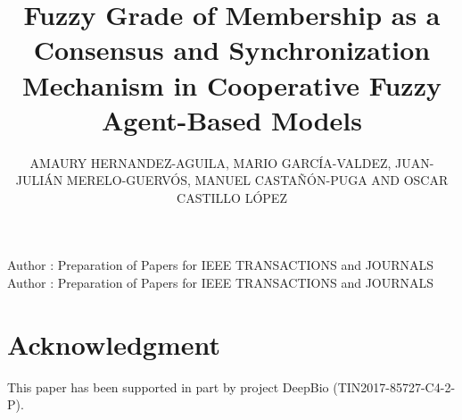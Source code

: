 \documentclass{ieeeaccess}
\begin{document}

\title{Fuzzy Grade of Membership as a Consensus and Synchronization Mechanism in Cooperative Fuzzy Agent-Based Models}
\author{
    \uppercase{Amaury Hernandez-Aguila,
    Mario Garc\'{i}a-Valdez,
    Juan-Juli\'{A}n Merelo-Guerv\'{o}s,
    Manuel Casta\~{n}\'{o}n-Puga and
    Oscar Castillo L\'{o}pez}}
\address[1]{National Technological Institute of Mexico, Calzada Del Tecnol\'{o}gico s/n, Fraccionamiento Tomas Aquino, Tijuana, BC 22414 Mexico (e-mail: {amerhag,mario,ocastillo}@tectijuana.edu.mx)}
\address[2]{University of Granada, Campus Aynadamar Daniel Saucedo Aranda s/n, Granada 18071, 80523 Spain (e-mail: jmerelo@geneura.ugr.es)}
\address[3]{Autonomous University of Baja California, Calzada Universidad 14418, Tijuana, BC, 22390, Mexico (e-mail: puga@uabc.edu.mx)}

\tfootnote{}

\markboth
{Author \headeretal: Preparation of Papers for IEEE TRANSACTIONS and JOURNALS}
{Author \headeretal: Preparation of Papers for IEEE TRANSACTIONS and JOURNALS}





\titlepgskip=-15pt

\maketitle











\section*{Acknowledgment}
This paper has been supported in part by project DeepBio (TIN2017-85727-C4-2-P).
\end{document}
